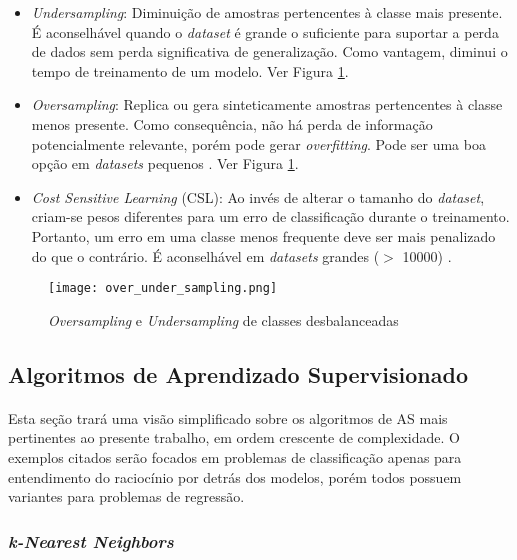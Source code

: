 \begin{itemize}
    \item \textit{Undersampling}: Diminuição de amostras pertencentes à classe mais presente. É aconselhável quando o \textit{dataset} é grande o suficiente para suportar a perda de dados sem perda significativa de generalização. Como vantagem, diminui o tempo de treinamento de um modelo. Ver Figura \ref{fig:7}.
    \item \textit{Oversampling}: Replica ou gera sinteticamente amostras pertencentes à classe menos presente. Como consequência, não há perda de informação potencialmente relevante, porém pode gerar \textit{overfitting}. Pode ser uma boa opção em \textit{datasets} pequenos \cite{weiss2007cost}. Ver Figura \ref{fig:7}.
    \item \textit{Cost Sensitive Learning} (CSL): Ao invés de alterar o tamanho do \textit{dataset}, criam-se pesos diferentes para um erro de classificação durante o treinamento. Portanto, um erro em uma classe menos frequente deve ser mais penalizado do que o contrário. É aconselhável em \textit{datasets} grandes ($>$ 10000) \cite{weiss2007cost}.
\end{itemize}

\begin{figure}[h]
    \texttt{[image: over\_under\_sampling.png]}
    \centering
    \caption{\textit{Oversampling} e \textit{Undersampling} de classes desbalanceadas \cite{over_under_sampling}}
    \label{fig:7}
\end{figure}



\FloatBarrier
\subsection{Algoritmos de Aprendizado Supervisionado}
\label{sub:alg_apren_sup}

\paragraph{} Esta seção trará uma visão simplificado sobre os algoritmos de AS mais pertinentes ao presente trabalho, em ordem crescente de complexidade. O exemplos citados serão focados em problemas de classificação apenas para entendimento do raciocínio por detrás dos modelos, porém todos possuem variantes para problemas de regressão.


\FloatBarrier
\subsubsection*{\textit{k-Nearest Neighbors}}

